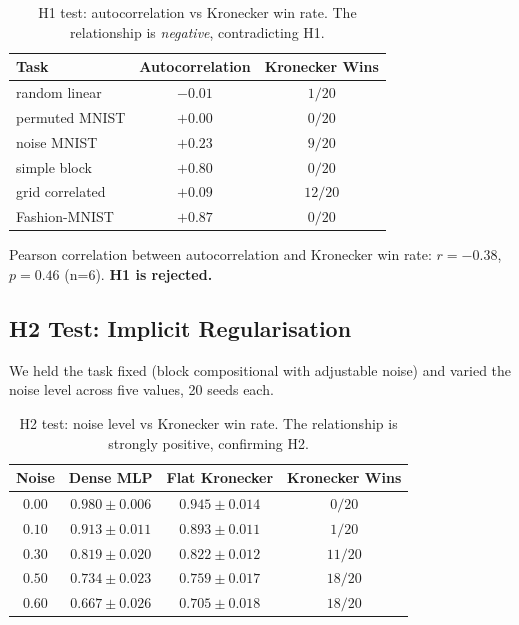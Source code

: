 \documentclass[11pt,a4paper]{article}
\begin{document}
\begin{table}[h]
\centering
\caption{H1 test: autocorrelation vs Kronecker win rate. The
relationship is \emph{negative}, contradicting H1.}
\label{tab:h1}
\small
\begin{tabular}{lcc}
\toprule
Task & Autocorrelation & Kronecker Wins \\
\midrule
random linear     & $-0.01$ & $1/20$ \\
permuted MNIST    & $+0.00$ & $0/20$ \\
noise MNIST       & $+0.23$ & $9/20$ \\
simple block      & $+0.80$ & $0/20$ \\
grid correlated   & $+0.09$ & $12/20$ \\
Fashion-MNIST     & $+0.87$ & $0/20$ \\
\bottomrule
\end{tabular}
\end{table}

Pearson correlation between autocorrelation and Kronecker win rate:
$r = -0.38$, $p = 0.46$ (n=6). \textbf{H1 is rejected.}


\subsection{H2 Test: Implicit Regularisation}
\label{sec:h2}

We held the task fixed (block compositional with adjustable noise)
and varied the noise level across five values, 20 seeds each.

\begin{table}[h]
\centering
\caption{H2 test: noise level vs Kronecker win rate. The
relationship is strongly positive, confirming H2.}
\label{tab:h2}
\small
\begin{tabular}{cccc}
\toprule
Noise & Dense MLP & Flat Kronecker & Kronecker Wins \\
\midrule
$0.00$ & $0.980 \pm 0.006$ & $0.945 \pm 0.014$ & $0/20$ \\
$0.10$ & $0.913 \pm 0.011$ & $0.893 \pm 0.011$ & $1/20$ \\
$0.30$ & $0.819 \pm 0.020$ & $0.822 \pm 0.012$ & $11/20$ \\
$0.50$ & $0.734 \pm 0.023$ & $0.759 \pm 0.017$ & $18/20$ \\
$0.60$ & $0.667 \pm 0.026$ & $0.705 \pm 0.018$ & $18/20$ \\
\bottomrule
\end{tabular}
\end{table}
\end{document}
